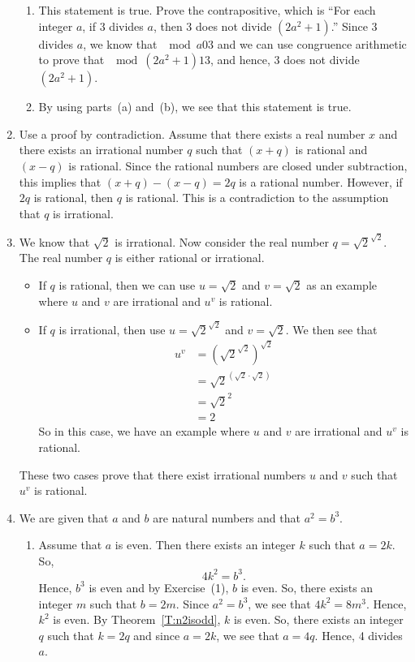 \begin{enumerate}
\begin{enumerate}
\item This statement is true.  Prove the contrapositive, which is ``For each integer $a$, if 3 divides $a$, then 3 does not divide $\left(2a^2 + 1 \right)$.''  Since 3 divides $a$, we know that $\mod{a}{0}{3}$ and we can use congruence arithmetic to prove that $\mod{\left(2a^2 + 1 \right)}{1}{3}$, and hence, 3 does not divide $\left(2a^2 + 1 \right)$.

\item By using parts~(a) and~(b), we see that this statement is true.
\end{enumerate}


\item Use a proof by contradiction.  Assume that there exists a real number $x$ and there exists an irrational number $q$ such that $(x + q)$ is rational and $(x - q)$ is rational.  Since the rational numbers are closed under subtraction, this implies that $(x + q) - (x - q) = 2q$ is a rational number.  However, if $2q$ is rational, then $q$ is rational.  This is a contradiction to the assumption that $q$ is irrational.


\item We know that $\sqrt{2}$ is irrational.  Now consider the real number $q = \sqrt{2}^{\sqrt{2}}$.  The real number $q$ is either rational or irrational.
\begin{itemize}
\item If $q$ is rational, then we can use $u = \sqrt{2}$ and $v = \sqrt{2}$ as an example where $u$ and $v$ are irrational and $u^v$ is rational.

\item If $q$ is irrational, then use $u = \sqrt{2}^{\sqrt{2}}$ and $v = \sqrt{2}$.  We then see that
\begin{align*}
u^v &= \left( \sqrt{2}^{\sqrt{2}} \right)^{\sqrt{2}} \\
    &= \sqrt{2}^{\left( \sqrt{2} \cdot \sqrt{2} \right)} \\
    &= \sqrt{2}^2 \\
    &= 2
\end{align*}
So in this case, we have an example where $u$ and $v$ are irrational and $u^v$ is rational.
\end{itemize}
These two cases prove that there exist irrational numbers $u$ and $v$ such that $u^v$ is rational.



\item  We are given that $a$ and $b$ are natural numbers and that $a^2 = b^3$.
\begin{enumerate}
\item Assume that $a$ is even.  Then there exists an integer $k$ such that $a = 2k$.  So,
\[
4k^2 = b^3.
\]
Hence, $b^3$ is even and by Exercise~(1), $b$ is even. So, there exists an integer $m$ such that $b = 2m$.  Since $a^2 = b^3$, we see that $4k^2 = 8m^3$.  Hence, $k^2$ is even.  By 
Theorem~\ref{T:n2isodd}, $k$ is even.  So, there exists an integer $q$ such that $k = 2q$ and since $a = 2k$, we see that $a = 4q$.  Hence, 4 divides $a$.


\end{enumerate}
\end{enumerate}
